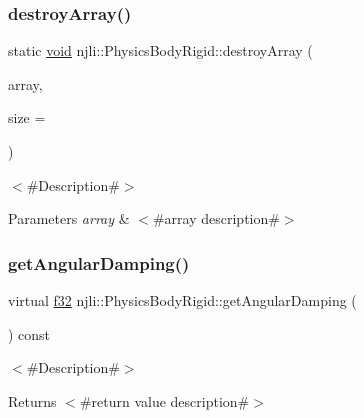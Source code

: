 \subsubsection{\texorpdfstring{destroy\+Array()}{destroyArray()}}
{\footnotesize\ttfamily static \mbox{\hyperlink{_thread_8h_af1e856da2e658414cb2456cb6f7ebc66}{void}} njli\+::\+Physics\+Body\+Rigid\+::destroy\+Array (\begin{DoxyParamCaption}\item[{\mbox{\hyperlink{classnjli_1_1_physics_body_rigid}{Physics\+Body\+Rigid}} $\ast$$\ast$}]{array,  }\item[{const \mbox{\hyperlink{_util_8h_a10e94b422ef0c20dcdec20d31a1f5049}{u32}}}]{size = {} }\end{DoxyParamCaption})\hspace{0.3cm}{\ttfamily [static]}}

$<$\#\+Description\#$>$


\begin{DoxyParams}{Parameters}
{\em array} & $<$\#array description\#$>$ \\
\hline
\end{DoxyParams}
\mbox{\label{classnjli_1_1_physics_body_rigid_ab6d50a3ae1ec1756ed4d530bf7a4a9d4}} 
\subsubsection{\texorpdfstring{get\+Angular\+Damping()}{getAngularDamping()}}
{\footnotesize\ttfamily virtual \mbox{\hyperlink{_util_8h_a5f6906312a689f27d70e9d086649d3fd}{f32}} njli\+::\+Physics\+Body\+Rigid\+::get\+Angular\+Damping (\begin{DoxyParamCaption}{ }\end{DoxyParamCaption}) const\hspace{0.3cm}{\ttfamily [virtual]}}

$<$\#\+Description\#$>$

\begin{DoxyReturn}{Returns}
$<$\#return value description\#$>$ 
\end{DoxyReturn}
\mbox{\label{classnjli_1_1_physics_body_rigid_a2c2f3087ebc43b32ceb3fdb13935fcca}} 
